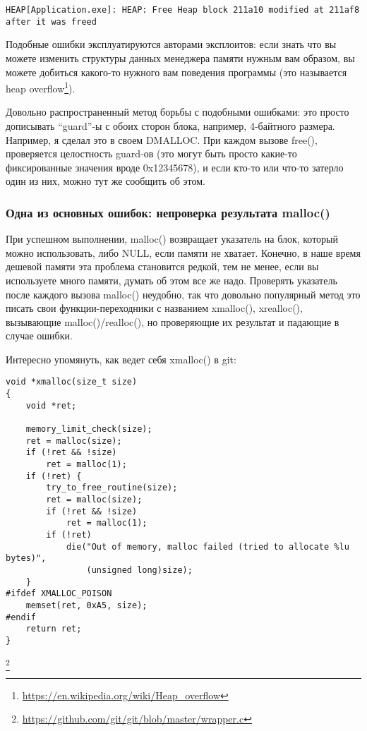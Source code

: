 \begin{lstlisting}
HEAP[Application.exe]: HEAP: Free Heap block 211a10 modified at 211af8 after it was freed
\end{lstlisting}

Подобные ошибки эксплуатируются авторами эксплоитов: если знать что вы можете изменить структуры данных
менеджера памяти нужным вам образом, вы можете добиться какого-то нужного вам поведения программы 
(это называется heap overflow\footnote{\url{https://en.wikipedia.org/wiki/Heap_overflow}}).

Довольно распространенный метод борьбы с подобными ошибками: это просто дописывать ``guard''-ы с обоих сторон
блока, например, 4-байтного размера. Например, я сделал это в своем DMALLOC. При каждом вызове free(),
проверяется целостность guard-ов (это могут быть просто какие-то фиксированные значения вроде 0x12345678),
и если кто-то или что-то затерло один из них, можно тут же сообщить об этом.


\subsubsection{Одна из основных ошибок: непроверка результата malloc()}

При успешном выполнении, malloc() возвращает указатель на блок, который можно использовать, либо NULL,
если памяти не хватает. Конечно, в наше время дешевой памяти эта проблема становится редкой, тем не менее,
если вы используете много памяти, думать об этом все же надо. Проверять указатель после каждого вызова
malloc() неудобно, так что довольно популярный метод это писать свои функции-переходники с названием 
xmalloc(), xrealloc(), вызывающие malloc()/realloc(), но проверяющие их результат и падающие в случае
ошибки.

Интересно упомянуть, как ведет себя xmalloc() в git:

\begin{lstlisting}
void *xmalloc(size_t size)
{
	void *ret;

	memory_limit_check(size);
	ret = malloc(size);
	if (!ret && !size)
		ret = malloc(1);
	if (!ret) {
		try_to_free_routine(size);
		ret = malloc(size);
		if (!ret && !size)
			ret = malloc(1);
		if (!ret)
			die("Out of memory, malloc failed (tried to allocate %lu bytes)",
			    (unsigned long)size);
	}
#ifdef XMALLOC_POISON
	memset(ret, 0xA5, size);
#endif
	return ret;
}
\end{lstlisting}
\footnote{\url{https://github.com/git/git/blob/master/wrapper.c}}

